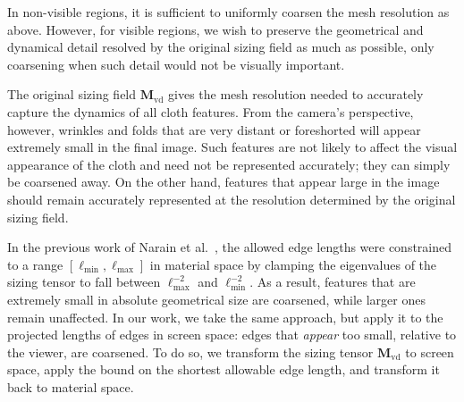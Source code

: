 \documentclass[10pt,journal,compsoc,twoside]{TexInputs/IEEEtran}
\begin{document}
In non-visible regions, it is sufficient to uniformly coarsen the mesh resolution as above.
However, for visible regions, we wish to preserve the geometrical and dynamical detail resolved by the original sizing field as much as possible, only coarsening when such detail would not be visually important.

The original sizing field $\mathbf M_{\text{vd}}$ gives the mesh resolution needed to accurately capture the dynamics of all cloth features.
From the camera's perspective, however, wrinkles and folds that are very distant or foreshorted will appear extremely small in the final image.
Such features are not likely to affect the visual appearance of the cloth and need not be represented accurately; they can simply be coarsened away.
On the other hand, features that appear large in the image should remain accurately represented at the resolution determined by the original sizing field.




In the previous work of Narain et al.~\cite{Narain:2012:AAR}, the allowed edge lengths were constrained to a range $[\ell_{\min},\ell_{\max}]$ in material space by clamping the eigenvalues of the sizing tensor to fall between $\ell_{\max}^{-2}$ and $\ell_{\min}^{-2}$.
As a result, features that are extremely small in absolute geometrical size are coarsened, while larger ones remain unaffected.
In our work, we take the same approach, but apply it to the projected lengths of edges in screen space: edges that \emph{appear} too small, relative to the viewer, are coarsened.
To do so, we transform the sizing tensor $\mathbf{M}_{\text{vd}}$ to screen space, apply the bound on the shortest allowable edge length, and transform it back to material space.
\end{document}
